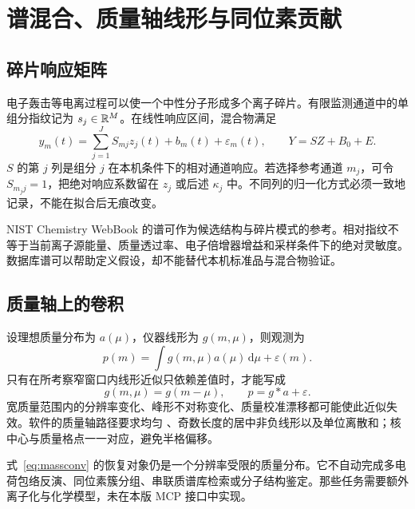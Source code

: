 \chapter{谱混合、质量轴线形与同位素贡献}
\section{碎片响应矩阵}
电子轰击等电离过程可以使一个中性分子形成多个离子碎片。有限监测通道中的单组分指纹记为 $s_j\in\mathbb{R}^M$。在线性响应区间，混合物满足
\begin{equation}
 y_m(t)=\sum_{j=1}^J S_{mj}z_j(t)+b_m(t)+\varepsilon_m(t),
 \qquad Y=SZ+B_0+E.\label{eq:mix}
\end{equation}
$S$ 的第 $j$ 列是组分 $j$ 在本机条件下的相对通道响应。若选择参考通道 $m_j$，可令 $S_{m_jj}=1$，把绝对响应系数留在 $z_j$ 或后述 $\kappa_j$ 中。不同列的归一化方式必须一致地记录，不能在拟合后无痕改变。

NIST Chemistry WebBook 的谱可作为候选结构与碎片模式的参考\cite{nistweb}。相对指纹不等于当前离子源能量、质量透过率、电子倍增器增益和采样条件下的绝对灵敏度。数据库谱可以帮助定义假设，却不能替代本机标准品与混合物验证。

\section{质量轴上的卷积}
设理想质量分布为 $a(\mu)$，仪器线形为 $g(m,\mu)$，则观测为
\begin{equation}
 p(m)=\int g(m,\mu)a(\mu)\,\mathrm d\mu+\varepsilon(m).
\end{equation}
只有在所考察窄窗口内线形近似只依赖差值时，才能写成
\begin{equation}
 g(m,\mu)=g(m-\mu),\qquad p=g*a+\varepsilon.\label{eq:massconv}
\end{equation}
宽质量范围内的分辨率变化、峰形不对称变化、质量校准漂移都可能使此近似失效。软件的质量轴路径要求均匀 、奇数长度的居中非负线形以及单位离散和；核中心与质量格点一一对应，避免半格偏移。

式~\eqref{eq:massconv} 的恢复对象仍是一个分辨率受限的质量分布。它不自动完成多电荷包络反演、同位素簇分组、串联质谱库检索或分子结构鉴定。那些任务需要额外离子化与化学模型，未在本版 MCP 接口中实现。


